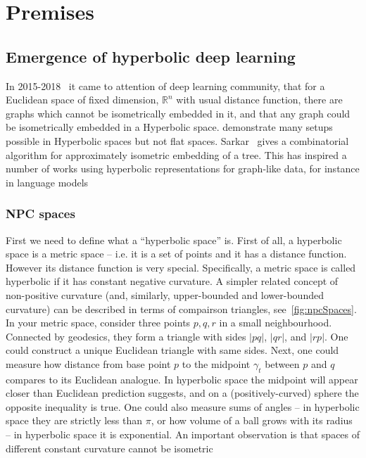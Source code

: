 %


\chapter{Premises} \label{chap:premises}

\section{Emergence of hyperbolic deep learning} \label{sec:history}

In
2015-2018~\cite{spaceTimeEmbeddings,nickelKiela17,embeddings2018dhingra,wilson2018gradient}
it came to attention of deep learning community, that for a
Euclidean space of fixed dimension, \( \mathbb{R}^n \) with usual distance
function, there are graphs which cannot be isometrically embedded in it, and
that any graph could be isometrically embedded in a Hyperbolic space.
\citet{spaceTimeEmbeddings} demonstrate many setups possible in Hyperbolic
spaces but not flat spaces.
Sarkar~\cite{sarkar} gives a combinatorial algorithm for approximately
isometric embedding of a tree. This has inspired a number of works using
hyperbolic representations for graph-like data, for instance in language models

\subsection*{NPC spaces}

First we need to define what a ``hyperbolic space'' is. First of all, a
hyperbolic space is a metric space -- i.e. it is a set of points and it has a
distance function. However its distance function is very special.
Specifically, a metric space is called hyperbolic if it has constant negative
curvature. A simpler related concept of non-positive curvature (and, similarly,
upper-bounded and lower-bounded curvature) can be described in terms of
compairson triangles, see~\autoref{fig:npcSpaces}. In your metric space,
consider three points $p, q, r$ in a small neighbourhood.  Connected by
geodesics, they form a triangle with sides $|pq|$, $|qr|$, and $|rp|$.  One
could construct a unique Euclidean triangle with same sides. Next, one could
measure how distance from base point $p$ to the midpoint $\gamma_t$ between $p$
and $q$ compares to its Euclidean analogue. In hyperbolic space the midpoint
will appear closer than Euclidean prediction suggests, and on a
(positively-curved) sphere the opposite inequality is true. One could also
measure sums of angles -- in hyperbolic space they are strictly less than
$\pi$, or how volume of a ball grows with its radius -- in hyperbolic space it
is exponential. An important observation is that spaces of different constant
curvature cannot be isometric

